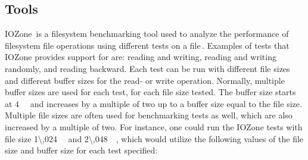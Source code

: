 \subsection{Tools}
IOZone\,\cite{IozoneFilesystemBenchmark} is a filesystem benchmarking tool used to analyze the performance of filesystem file operations using different tests on a file\,\cite{iozoneIozoneFilesystemBenchmark}. Examples of tests that IOZone provides support for are: reading and writing, reading and writing randomly, and reading backward. Each test can be run with different file sizes and different buffer sizes for the read- or write operation. Normally, multiple buffer sizes are used for each test, for each file size tested. The buffer size starts at \SI{4}{\kilo\byte} and increases by a multiple of two up to a buffer size equal to the file size. Multiple file sizes are often used for benchmarking tests as well, which are also increased by a multiple of two. For instance, one could run the IOZone tests with file size \SI{1\,024}{\kilo\byte} and \SI{2\,048}{\kilo\byte}, which would utilize the following values of the file size and buffer size for each test specified:
